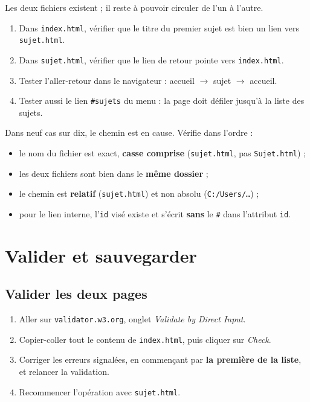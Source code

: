 \documentclass[a4paper,11pt]{article}
\begin{document}
Les deux fichiers existent ; il reste à pouvoir circuler de l'un à l'autre.

\begin{enumerate}
  \item Dans \texttt{index.html}, vérifier que le titre du premier sujet est bien un lien vers \texttt{sujet.html}.
  \item Dans \texttt{sujet.html}, vérifier que le lien de retour pointe vers \texttt{index.html}.
  \item Tester l'aller-retour dans le navigateur : accueil $\rightarrow$ sujet $\rightarrow$ accueil.
  \item Tester aussi le lien \texttt{\#sujets} du menu : la page doit défiler jusqu'à la liste des sujets.
\end{enumerate}

\begin{tcolorbox}[attention, title={Si un lien ne fonctionne pas}]
Dans neuf cas sur dix, le chemin est en cause. Vérifie dans l'ordre :
\begin{itemize}
  \item le nom du fichier est exact, \textbf{casse comprise} (\texttt{sujet.html}, pas \texttt{Sujet.html}) ;
  \item les deux fichiers sont bien dans le \textbf{même dossier} ;
  \item le chemin est \textbf{relatif} (\texttt{sujet.html}) et non absolu (\texttt{C:/Users/\dots}) ;
  \item pour le lien interne, l'\texttt{id} visé existe et s'écrit \textbf{sans} le \texttt{\#} dans l'attribut \texttt{id}.
\end{itemize}
\end{tcolorbox}

\section{Valider et sauvegarder}

\subsection{Valider les deux pages}

\begin{enumerate}
  \item Aller sur \texttt{validator.w3.org}, onglet \textit{Validate by Direct Input}.
  \item Copier-coller tout le contenu de \texttt{index.html}, puis cliquer sur \textit{Check}.
  \item Corriger les erreurs signalées, en commençant par \textbf{la première de la liste}, et relancer la validation.
  \item Recommencer l'opération avec \texttt{sujet.html}.
\end{enumerate}
\end{document}
